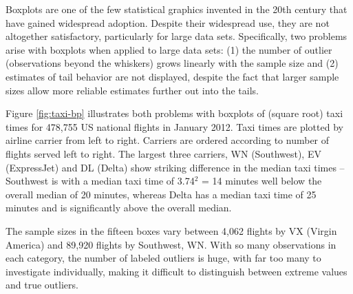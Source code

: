 \documentclass[12pt,oneside]{article}
\begin{document}
Boxplots are one of the few statistical graphics invented in the 20th century
that have gained widespread adoption. Despite their widespread use, they are
not altogether satisfactory, particularly for large data sets. Specifically,
two problems arise with boxplots when applied to large data sets: (1) the
number of outlier (observations beyond the whiskers) grows linearly with
the sample size and (2) estimates of tail behavior are not displayed, despite
the fact that larger sample sizes allow more reliable estimates further out
into the tails. 

Figure \ref{fig:taxi-bp} illustrates both problems with boxplots of (square root) taxi times for 478,755 US national flights in January 2012.  Taxi times are plotted by airline carrier from left to right. Carriers are ordered according to number of flights served left to right. The largest three carriers, WN (Southwest), EV (ExpressJet)  and DL (Delta) show striking difference in the median taxi times -- Southwest is with a median taxi time of 3.74$^2$ = 14 minutes well below the overall median of 20 minutes, whereas Delta has a median taxi time of 25 minutes and is significantly above the overall median.

The sample sizes in the fifteen boxes vary between 4,062 flights by VX (Virgin America) and 89,920 flights by Southwest, WN. 
With so many
observations in each category, the number of labeled outliers is huge, with
far too many to investigate individually, making it difficult to distinguish
between extreme values and true outliers.

%
%
\end{document}
